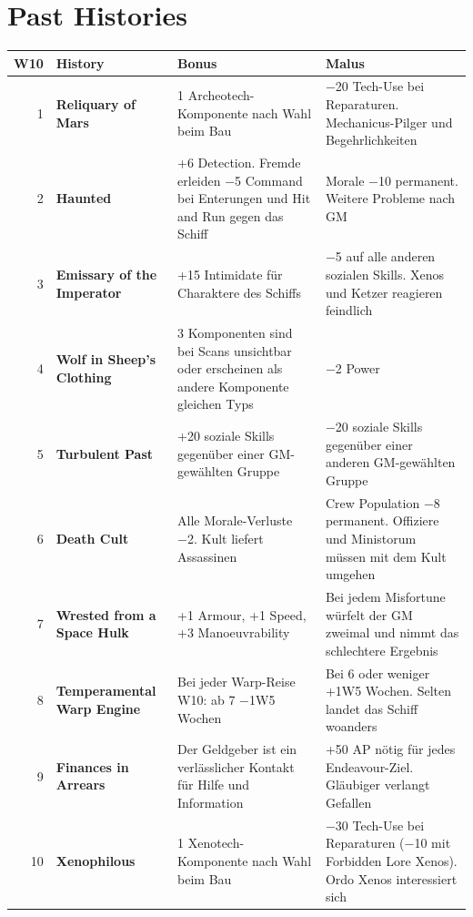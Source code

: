 \documentclass[9pt,a4paper]{extarticle}
\newcommand{\plus}[1]{\textcolor{good}{#1}}
\newcommand{\minus}[1]{\textcolor{bad}{#1}}
\newcommand{\nm}[1]{\textbf{#1}}
\newcommand{\src}[1]{\hfill\raisebox{3pt}{\monofont\footnotesize\color{ink3}#1}}
\begin{document}
\section{Past Histories \src{S. 198, Tabelle 8-2}}

\begin{xltabular}{\linewidth}{N l Y Y}
\toprule
{}\textbf{W10} & \textbf{History} & \textbf{Bonus} & \textbf{Malus}\\
\midrule
{} & \nm{Reliquary of Mars} & 1 Archeotech-Komponente nach Wahl beim Bau & \minus{−20 Tech-Use} bei Reparaturen. Mechanicus-Pilger und Begehrlichkeiten\\
2 & \nm{Haunted} & \plus{+6 Detection}. Fremde erleiden \plus{−5 Command} bei Enterungen und Hit and Run gegen das Schiff & \minus{Morale −10} permanent. Weitere Probleme nach GM\\
3 & \nm{Emissary of the Imperator} & \plus{+15 Intimidate} für Charaktere des Schiffs & \minus{−5 auf alle anderen sozialen Skills}. Xenos und Ketzer reagieren feindlich\\
4 & \nm{Wolf in Sheep's Clothing} & 3 Komponenten sind bei Scans unsichtbar oder erscheinen als andere Komponente gleichen Typs & \minus{−2 Power}\\
5 & \nm{Turbulent Past} & \plus{+20 soziale Skills} gegenüber einer GM-gewählten Gruppe & \minus{−20 soziale Skills} gegenüber einer anderen GM-gewählten Gruppe\\
6 & \nm{Death Cult} & \plus{Alle Morale-Verluste −2}. Kult liefert Assassinen & \minus{Crew Population −8} permanent. Offiziere und Ministorum müssen mit dem Kult umgehen\\
7 & \nm{Wrested from a Space Hulk} & \plus{+1 Armour, +1 Speed, +3 Manoeuvrability} & Bei jedem Misfortune würfelt der GM zweimal und nimmt das schlechtere Ergebnis\\
8 & \nm{Temperamental Warp Engine} & Bei jeder Warp-Reise W10: ab 7 \plus{−1W5 Wochen} & Bei 6 oder weniger \minus{+1W5 Wochen}. Selten landet das Schiff woanders\\
9 & \nm{Finances in Arrears} & Der Geldgeber ist ein verlässlicher Kontakt für Hilfe und Information & \minus{+50 AP} nötig für jedes Endeavour-Ziel. Gläubiger verlangt Gefallen\\
10 & \nm{Xenophilous} & 1 Xenotech-Komponente nach Wahl beim Bau & \minus{−30 Tech-Use} bei Reparaturen (−10 mit Forbidden Lore Xenos). Ordo Xenos interessiert sich\\
\bottomrule
\end{xltabular}
\end{document}
